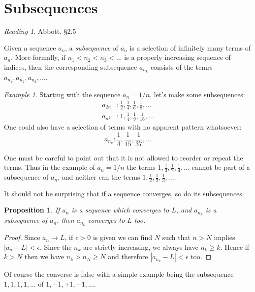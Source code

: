 \documentclass[11pt,oneside]{amsbook}
\theoremstyle{definition}
\theoremstyle{plain}
\newtheorem{prop}[thm]{Proposition}
\theoremstyle{definition}
\theoremstyle{remark}
\newtheorem{example}[thm]{Example}
\newtheorem*{reading}{Reading}
\numberwithin{equation}{section}
\numberwithin{figure}{section}
\begin{document}
\newpage
\section{Subsequences}

\begin{reading}
  Abbott, \S 2.5
\end{reading}

Given a sequence $a_n$, a \emph{subsequence} of $a_n$ is a selection of infinitely many terms of $a_n$. More formally, if $n_1<n_2<n_3<\ldots$ is a properly increasing sequence of indices, then the corresponding subsequence $a_{n_k}$ consists of the temrs $a_{n_1},a_{n_2},a_{n_3},\ldots$.

\begin{example}
  Starting with the sequence $a_n=1/n$, let's make some subsequences:
  \begin{align*}
    a_{2n}&: \frac12, \frac14, \frac16, \frac18, \ldots\\
    a_{n^2}&: 1, \frac14, \frac19, \frac1{16}, \ldots
  \end{align*}
  One could also have a selection of terms with no apparent pattern whatsoever:
  \[a_{n_k}:\frac14, \frac{1}{15}, \frac{1}{37},\ldots
  \]
\end{example}

One must be careful to point out that it is not allowed to reorder or repeat the terms. Thus in the example of $a_n=1/n$ the terms $1,\frac13,\frac12,\frac14,\ldots$ cannot be part of a subsequence of $a_n$, and neither can the terms $1,\frac12,\frac12,\frac13,\ldots$.

It should not be surprising that if a sequence converges, so do its subsequences.

\begin{prop}
  \label{prop:subsequence}
  If $a_n$ is a sequence which converges to $L$, and $a_{n_k}$ is a subsequence of $a_n$, then $a_{n_k}$ converges to $L$ too.
\end{prop}

\begin{proof}
  Since $a_n\to L$, if $\epsilon>0$ is given we can find $N$ such that $n>N$ implies $|a_n-L|<\epsilon$. Since the $n_k$ are strictly increasing, we always have $n_k\geq k$. Hence if $k>N$ then we have $n_k>n_N\geq N$ and therefore $|a_{n_k}-L|<\epsilon$ too.
\end{proof}

Of course the converse is false with a simple example being the subsequence $1,1,1,1,\ldots$ of $1,-1,+1,-1,\ldots$.
\end{document}
